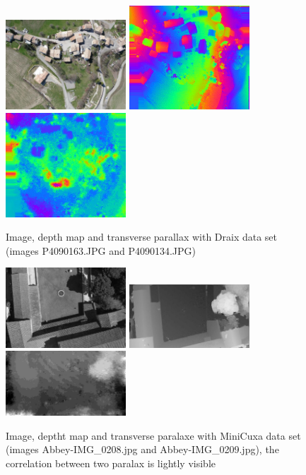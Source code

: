\begin{figure}
\begin{center}
\includegraphics[width=45mm]{FIGS/TestOri/DraixIl.JPG}
\includegraphics[width=45mm]{FIGS/TestOri/DraixPx1.jpg}
\includegraphics[width=45mm]{FIGS/TestOri/DraixPx2.jpg}
\end{center}
\caption{Image, depth map and transverse parallax with Draix data set
(images P4090163.JPG and P4090134.JPG)
}
\label{FIG:Draix:PxTr}
\end{figure}



\begin{figure}
\begin{center}
\includegraphics[width=45mm]{FIGS/TestOri/CuxIm.jpg}
\includegraphics[width=45mm]{FIGS/TestOri/CuxPx1.jpg}
\includegraphics[width=45mm]{FIGS/TestOri/CuxPx2.jpg}
\end{center}
\caption{Image, deptht map and transverse paralaxe with MiniCuxa data set
(images Abbey-IMG\_0208.jpg and Abbey-IMG\_0209.jpg), the correlation between two paralax
is lightly visible
}
\label{FIG:Cuxa:PxTr}
\end{figure}

